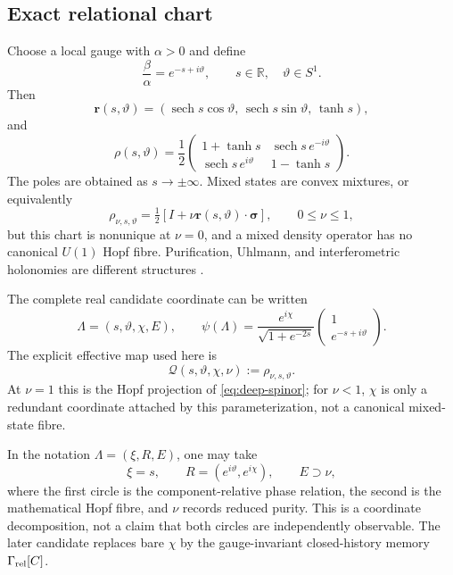 \documentclass[10pt]{article}
\theoremstyle{definition}
\theoremstyle{remark}
\newcommand{\R}{\mathbb R}
\newcommand{\sech}{\operatorname{sech}}
\newcommand{\cQ}{\mathcal Q}
\begin{document}
\subsection{Exact relational chart}

Choose a local gauge with \(\alpha>0\) and define
\begin{equation}
  \frac{\beta}{\alpha}=e^{-s+i\vartheta},
  \qquad s\in\R,\quad\vartheta\in S^1.
  \label{eq:ratio}
\end{equation}
Then
\begin{equation}
  \bm r(s,\vartheta)
  =
  \left(
  \sech s\cos\vartheta,\,
  \sech s\sin\vartheta,\,
  \tanh s
  \right),
  \label{eq:relational-bloch}
\end{equation}
and
\begin{equation}
  \rho(s,\vartheta)
  =
  \frac12
  \begin{pmatrix}
  1+\tanh s & \sech s\,e^{-i\vartheta}\\
  \sech s\,e^{i\vartheta} & 1-\tanh s
  \end{pmatrix}.
  \label{eq:relational-density}
\end{equation}
The poles are obtained as \(s\to\pm\infty\). Mixed states are convex mixtures, or equivalently
\[
\rho_{\nu,s,\vartheta}
=\tfrac12[I+\nu\bm r(s,\vartheta)\cdot\bm\sigma],
\qquad 0\le\nu\le1,
\]
but this chart is nonunique at \(\nu=0\), and a mixed density operator has no canonical \(U(1)\) Hopf fibre. Purification, Uhlmann, and interferometric holonomies are different structures \citep{Uhlmann1986,Sjoqvist2000}.

The complete real candidate coordinate can be written
\begin{equation}
  \Lambda=(s,\vartheta,\chi,E),
  \qquad
  \psi(\Lambda)
  =
  \frac{e^{i\chi}}{\sqrt{1+e^{-2s}}}
  \begin{pmatrix}1\\e^{-s+i\vartheta}\end{pmatrix}.
  \label{eq:deep-spinor}
\end{equation}
The explicit effective map used here is
\begin{equation}
  \cQ(s,\vartheta,\chi,\nu)
  :=
  \rho_{\nu,s,\vartheta}.
  \label{eq:mixed-projection}
\end{equation}
At \(\nu=1\) this is the Hopf projection of \cref{eq:deep-spinor}; for \(\nu<1\), \(\chi\) is only a redundant coordinate attached by this parameterization, not a canonical mixed-state fibre.

In the notation \(\Lambda=(\xi,R,E)\), one may take
\[
\xi=s,\qquad
R=(e^{i\vartheta},e^{i\chi}),\qquad
E\supset\nu,
\]
where the first circle is the component-relative phase relation, the second is the mathematical Hopf fibre, and \(\nu\) records reduced purity. This is a coordinate decomposition, not a claim that both circles are independently observable. The later candidate replaces bare \(\chi\) by the gauge-invariant closed-history memory \(\Gamma_{\rm rel}[C]\).
\end{document}
